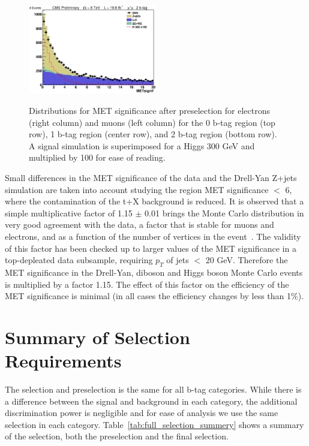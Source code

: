 \begin{figure}[htb!]
{    \includegraphics[width=0.5\textwidth]{presentation/defense/images/preselection/2/mu/METsignif.eps}
  }
  \caption{
    Distributions for MET significance after preselection for electrons (right column) and muons (left column) for the 0 b-tag region (top row), 1 b-tag region (center row), and 2 b-tag region (bottom row).  A signal simulation is superimposed for a Higgs 300 GeV and multiplied by 100 for ease of reading.
  }
  \label{fig:metsignificance}
\end{figure}


Small differences in the MET significance of the data and the Drell-Yan Z+jets simulation are taken into account studying the region MET significance $<$ 6, where the contamination of the t+X background is reduced. It is observed that a simple multiplicative factor of 1.15 $\pm$ 0.01 brings the Monte Carlo distribution in very good agreement with the data, a factor that is stable for muons and electrons, and as a function of the number of vertices in the event~\cite{CMS-AN-HIG-13-064}. The validity of this factor has been checked up to larger values of the MET significance in a top-depleated data subsample, requiring $p_T$ of jets $<$ 20 GeV. Therefore the MET significance in the Drell-Yan, diboson and Higgs boson Monte Carlo events is multiplied by a factor 1.15. The effect of this factor on the efficiency of the MET significance is minimal (in all cases the efficiency changes by less than 1\%).



\section{Summary of Selection Requirements}
\label{sec:summaryofselectionrequirements}

The selection and preselection is the same for all b-tag categories. While there is a difference between the signal and background in each category, the additional discrimination power is negligible and for ease of analysis we use the same selection in each category.  Table~\ref{tab:full_selection_summery} shows a summary of the selection, both the preselection and the final selection.  

